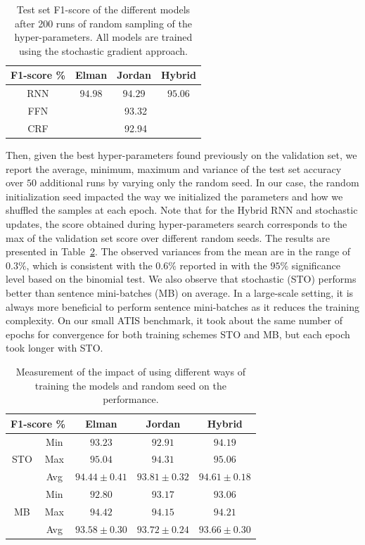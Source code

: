 \begin{table}
\centering
\begin{tabular}{|c|c|c|c|}
\hline
F1-score \% &  Elman  & Jordan & Hybrid \\
\hline
RNN & $94.98$ &   $94.29$ &   $95.06$ \\
\hline
FFN & \multicolumn{3}{c|}{93.32} \\
CRF & \multicolumn{3}{c|}{92.94} \\
\hline
\end{tabular}
\caption[Test set F1-score on ATIS]{Test set F1-score of the different models after 200 runs of random
sampling of the hyper-parameters. All models are trained using the stochastic
gradient approach.}
\label{tab:f1}
\end{table}

Then, given the best hyper-parameters found previously on the validation set,
we report the average, minimum, maximum and variance of the test set accuracy
over $50$ additional runs by varying only the random seed. In our case, the
random initialization seed impacted the way we initialized the parameters and
how we shuffled the samples at each epoch. Note that for the Hybrid RNN and
stochastic updates, the score obtained during hyper-parameters search
corresponds to the max of the validation set score over different random seeds.
The results are presented in Table~\ref{tab:seed}. The observed variances from the mean are
in the range of $0.3\%$, which is consistent with the $0.6\%$ reported in \citep{rnn24} with
the $95\%$ significance level based on the binomial test. We also observe that
stochastic (STO) performs better than sentence mini-batches (MB) on average. In
a large-scale setting, it is always more beneficial to perform sentence
mini-batches as it reduces the training complexity. On our small ATIS
benchmark, it took about the same number of epochs for convergence for both
training schemes STO and MB, but each epoch took longer with STO.

\begin{table}
\centering
\begin{tabular}{|c|c|c|c|c|}
\hline
\multicolumn{2}{|c|}{F1-score \%} &  Elman &  Jordan & Hybrid \\
\hline
\multirow{3}{*}{STO} & Min & $93.23$ &  $92.91$ &   $94.19$ \\
 &   Max &  $95.04$  &  $94.31$  & $95.06$ \\
        & Avg & $94.44 \pm 0.41$ &  $93.81 \pm0.32$ &  $94.61 \pm0.18$ \\
\hline
\multirow{3}{*}{MB} & Min & $92.80$ &  $93.17$ &   $93.06$ \\
 &   Max &  $94.42$  &  $94.15$  & $94.21$ \\
        & Avg & $93.58 \pm 0.30$ &  $93.72 \pm0.24$ &  $93.66 \pm0.30$ \\
\hline
\end{tabular}
\caption[Random Seed and Stochastic versus Mini-batch modes]{Measurement of the impact of using different ways of training the models and random seed on the performance.}
\label{tab:seed}
\end{table}
                
